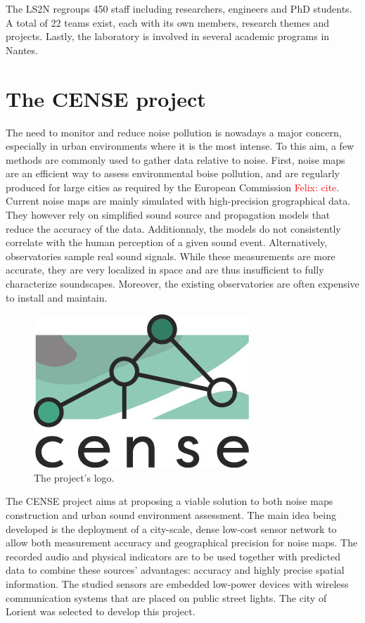 \documentclass[12pt,times,onecolumn]{article}
\newcommand{\fg}[1]{\textcolor{red}{ Felix: #1}}
\begin{document}
The LS2N regroups 450 staff including researchers, engineers and PhD students. A total of 22 teams exist, each with its own members, research themes and projects. Lastly, the laboratory is involved in several academic programs in Nantes.

\section{The CENSE project}

The need to monitor and reduce noise pollution is nowadays a major concern, especially in urban environments where it is the most intense. To this aim, a few methods are commonly used to gather data relative to noise. First, noise maps are an efficient way to assess environmental boise pollution, and are regularly produced for large cities as required by the European Commission \fg{cite}. Current noise maps are mainly simulated with high-precision grographical data. They however rely on simplified sound source and propagation models that reduce the accuracy of the data. Additionnaly, the models do not consistently correlate with the human perception of a given sound event. Alternatively, observatories sample real sound signals. While these measurements are more accurate, they are very localized in space and are thus insufficient to fully characterize soundscapes. Moreover, the existing observatories are often expensive to install and maintain.\\

\begin{figure}[htbp]
	\centering
		\includegraphics[width=0.4\columnwidth]{figures/CENSE-logo.jpg}
	\caption{The project's logo.}
	\label{fig:cense_logo}
\end{figure}

The CENSE project aims at proposing a viable solution to both noise maps construction and urban sound environment assessment. The main idea being developed is the deployment of a city-scale, dense low-cost sensor network to allow both measurement accuracy and geographical precision for noise maps. The recorded audio and physical indicators are to be used together with predicted data to combine these sources' advantages: accuracy and highly precise spatial information. The studied sensors are embedded low-power devices with wireless communication systems that are placed on public street lights. The city of Lorient was selected to develop this project.\\
\end{document}

